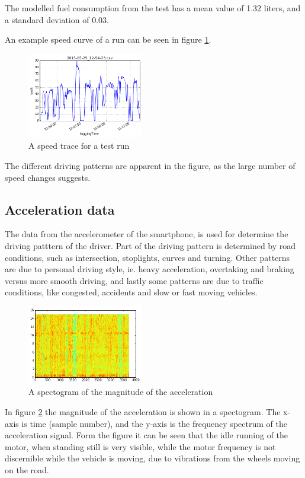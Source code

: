 \documentclass[conference]{IEEEtran}
\begin{document}
The modelled fuel consumption from the test has a mean value of 1.32 liters, and a standard deviation of 0.03.

An example speed curve of a run can be seen in figure \ref{speed}.

\begin{figure}[h]
	\centering
	\includegraphics[width=0.45\textwidth]{speed}
  \caption{A speed trace for a test run}
  \label{speed}
\end{figure}

The different driving patterns are apparent in the figure, as the large number of speed changes suggests.

\subsection{Acceleration data}

The data from the accelerometer of the smartphone, is used for determine the driving patttern of the driver. Part of the driving pattern is determined by road conditions, such as intersection, stoplights, curves and turning. Other patterns are due to personal driving style, ie. heavy acceleration, overtaking and braking versus more smooth driving, and lastly some patterns are due to traffic conditions, like congested, accidents and slow or fast moving vehicles.
\begin{figure}[h]
	\centering
	\includegraphics[width=0.45\textwidth]
{specgram}
  \caption{A spectogram of the magnitude of the acceleration}
  \label{spectogram}
\end{figure}
In figure \ref{spectogram} the magnitude of the acceleration is shown in a spectogram. The x-axis is time (sample number), and the y-axis is the frequency spectrum of the acceleration signal. Form the figure it can be seen that the idle running of the motor, when standing still is very visible, while the motor frequency is not discernible while the vehicle is moving, due to vibrations from the wheels moving on the road.
\end{document}
